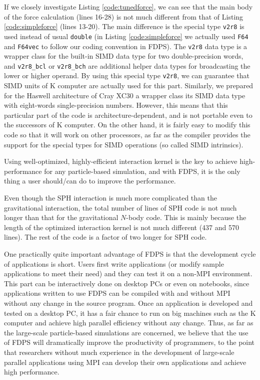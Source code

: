 \documentclass[dvipdfmx]{acm_proc_article-sp}
\begin{document}
If we closely investigate Listing \ref{code:tunedforce}, we can see
that the main body of the force calculation (lines 16-28) is not much
different from that of Listing \ref{code:simpleforce} (lines
13-20). The main difference is the special type {\tt v2r8} is used
instead of usual {\tt double} (in Listing \ref{code:simpleforce}  we
actually used {\tt F64} and
{\tt F64vec} to follow our coding convention in
FDPS). 
	The {\tt v2r8} data type is  a wrapper class 
	for the built-in SIMD data type for two double-precision
	words, and {\tt v2r8\_bcl} or {\tt v2r8\_bch} are additional
	helper data types  for broadcasting the lower or higher operand.	
By using this special type {\tt v2r8}, we can guarantee that
SIMD units of K computer are actually used for this part. 
	Similarly, we prepared for the Haswell architecture of Cray XC30
	a wrapper class its  SIMD data type with eight-words single-precision
	numbers.
However,
this means that this particular part of the code is
architecture-dependent, and is not portable even to the successors of K
computer. On the other hand, it is fairly easy to modify this code so
that it will work on other processors, as far as the compiler provides
the support for the special types for SIMD operations (so called SIMD
intrinsics). 

Using well-optimized, highly-efficient interaction kernel
is the key to achieve high-performance for any particle-based
simulation, and with FDPS, it is the only thing a user should/can do
to improve the performance.

Even though the SPH interaction is much more complicated than the
gravitational interaction, the total number of lines of SPH code is
not much longer than that for the gravitational $N$-body code. This is
mainly because the length of the optimized interaction kernel is not
much different (437 and 570 lines). The rest of the code is a factor
of two longer for SPH code.

One practically quite important advantage of FDPS is that the
development cycle of applications is short. Users first write
applications (or modify sample applications to meet their need) and
they can test it on a non-MPI environment. This part can be
interactively done on desktop PCs or even on notebooks, since
applications written to use FDPS can be compiled with and without MPI
without any change in the source program. Once an application is
developed and tested on a desktop PC, it has a fair chance to run on
big machines such as the K computer and achieve high parallel
efficiency without any change. Thus, as far as the large-scale
particle-based simulations are concerned, we believe that the use of
FDPS will dramatically improve the productivity of programmers, to the
point that researchers without much experience in the development of
large-scale parallel applications using MPI can develop their own
applications and achieve high performance.
\end{document}
